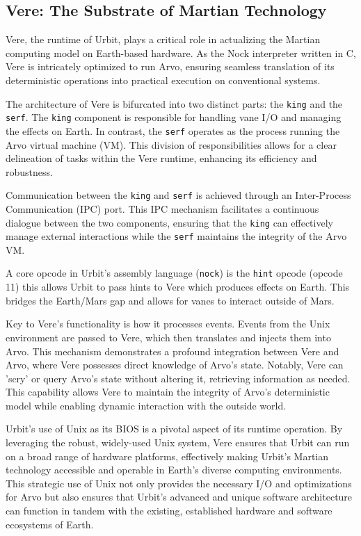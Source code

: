 \documentclass[twoside]{article}
\begin{document}
\subsection{Vere: The Substrate of Martian Technology}

Vere, the runtime of Urbit, plays a critical role in actualizing the Martian computing model on Earth-based hardware. As the Nock interpreter written in C, Vere is intricately optimized to run Arvo, ensuring seamless translation of its deterministic operations into practical execution on conventional systems.

The architecture of Vere is bifurcated into two distinct parts: the \texttt{king} and the \texttt{serf}. The \texttt{king} component is responsible for handling vane I/O and managing the effects on Earth. In contrast, the \texttt{serf} operates as the process running the Arvo virtual machine (VM). This division of responsibilities allows for a clear delineation of tasks within the Vere runtime, enhancing its efficiency and robustness.

Communication between the \texttt{king} and \texttt{serf} is achieved through an Inter-Process Communication (IPC) port. This IPC mechanism facilitates a continuous dialogue between the two components, ensuring that the \texttt{king} can effectively manage external interactions while the \texttt{serf} maintains the integrity of the Arvo VM.

A core opcode in Urbit's assembly language (\texttt{nock}) is the \texttt{hint} opcode (opcode 11) this allows Urbit to pass hints to Vere which produces effects on Earth. This bridges the Earth/Mars gap and allows for vanes to interact outside of Mars.

Key to Vere's functionality is how it processes events. Events from the Unix environment are passed to Vere, which then translates and injects them into Arvo. This mechanism demonstrates a profound integration between Vere and Arvo, where Vere possesses direct knowledge of Arvo's state. Notably, Vere can 'scry' or query Arvo's state without altering it, retrieving information as needed. This capability allows Vere to maintain the integrity of Arvo's deterministic model while enabling dynamic interaction with the outside world.

Urbit's use of Unix as its BIOS is a pivotal aspect of its runtime operation. By leveraging the robust, widely-used Unix system, Vere ensures that Urbit can run on a broad range of hardware platforms, effectively making Urbit's Martian technology accessible and operable in Earth's diverse computing environments. This strategic use of Unix not only provides the necessary I/O and optimizations for Arvo but also ensures that Urbit's advanced and unique software architecture can function in tandem with the existing, established hardware and software ecosystems of Earth.
\end{document}
